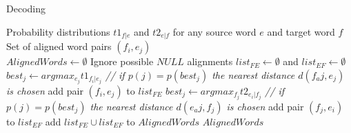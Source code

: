 \documentclass[11pt]{article}
\begin{document}
\begin{algorithm}[htb]
	\renewcommand{\algorithmicrequire}{\textbf{Input:}\hspace{10.7pt}}
	\renewcommand\algorithmicensure {\textbf{Output:} }
	\caption{Decoding}
	\label{alg:pbg}
		\begin{algorithmic}[1]
		\vspace{3pt}
		\REQUIRE
		Probability distributions $t1_{f|e}$ and $t2_{e|f}$ 
		for any source word $e$ and target word $f$\\
		\ENSURE Set of aligned word pairs $(f_i,e_j)$\\
		\STATE $AlignedWords \gets \emptyset$
			\STATE Ignore possible $NULL$ alignments
			\STATE $list_{FE} \gets \emptyset$ and $list_{EF} \gets \emptyset$
			 	\STATE $best_j \gets argmax_{e_j} t1_{f_i|e_j}$ \textit{// if $p(j) = p(best_j)$ the nearest distance $d(f_aj, e_j)$ is chosen}
			  	\STATE add pair $(f_i,e_j)$ to $list_{FE}$
			\ENDFOR
			 	\STATE $best_j \gets argmax_{f_j} t2_{e_i|f_j}$ \textit{// if $p(j) = p(best_j)$ the nearest distance $d(e_aj, f_j)$ is chosen}
			  	\STATE add pair $(f_j,e_i)$ to $list_{EF}$
			\ENDFOR
			\STATE add $list_{FE} \cup list_{EF}$ to $AlignedWords$
		\ENDFOR
	    \RETURN $AlignedWords$ 
	\end{algorithmic}
\end{algorithm}
\end{document}
